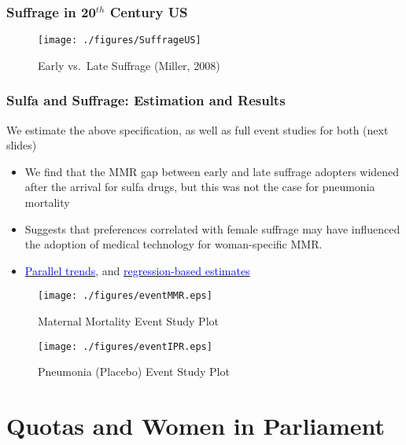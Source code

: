 \documentclass[10pt,letterpaper,subeqn]{beamer}
\begin{document}
\begin{frame}[plain,label=SuffrageUS]
\frametitle{Suffrage in 20$^{th}$ Century US}
\begin{figure}[h!]
\centering
\texttt{[image: ./figures/SuffrageUS]}
\caption{Early vs.\ Late Suffrage (Miller, 2008)}
\end{figure}
\end{frame}


\begin{frame}[label=USA]
\frametitle{Sulfa and Suffrage: Estimation and Results}
We estimate the above specification, as well as full event studies for both 
(next slides)
\vspace{5mm}
\begin{itemize}
\setlength{\itemsep}{15pt}
  \item We find that the MMR gap between early and late suffrage adopters widened 
        after the arrival for sulfa drugs, but this was not the case for 
        pneumonia mortality
  \item Suggests that preferences correlated with female suffrage may have 
        influenced the adoption of medical technology for woman-specific MMR.
  \item \hyperlink{ptrends}{\textcolor{blue}{Parallel trends}}, and 
        \hyperlink{DDreg}{\textcolor{blue}{regression-based estimates}}
\end{itemize}
\end{frame}




\begin{frame}[label=MMREvent,plain]
\begin{figure}
\caption{Maternal Mortality Event Study Plot}
\texttt{[image: ./figures/eventMMR.eps]}
\end{figure}
\end{frame}

\begin{frame}[label=IPREvent,plain]
\begin{figure}
\caption{Pneumonia (Placebo) Event Study Plot}
\texttt{[image: ./figures/eventIPR.eps]}
\end{figure}
\end{frame}




\section{Quotas and Women in Parliament}
\end{document}

